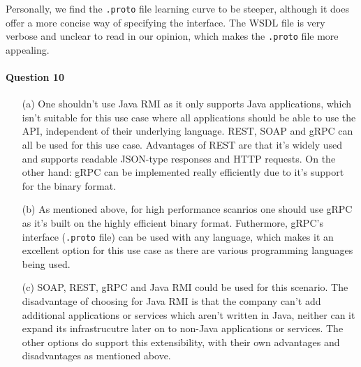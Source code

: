 \documentclass{ds-report}
\begin{document}
	Personally, we find the \texttt{.proto} file learning curve to be steeper, although it does offer a more concise way of specifying the interface. The WSDL file is very verbose and unclear to read in our opinion, which makes the \texttt{.proto} file more appealing.
	
	\paragraph{Question 10}
	\begin{enumerate}
		\item[(a)] One shouldn't use Java RMI as it only supports Java applications, which isn't suitable for this use case where all applications should be able to use the API, independent of their underlying language. REST, SOAP and gRPC can all be used for this use case. Advantages of REST are that it's widely used and supports readable JSON-type responses and HTTP requests. On the other hand: gRPC can be implemented really efficiently due to it's support for the binary format.
		\item[(b)] As mentioned above, for high performance scanrios one should use gRPC as it's built on the highly efficient binary format. Futhermore, gRPC's interface (\texttt{.proto} file) can be used with any language, which makes it an excellent option for this use case as there are various programming languages being used.
		\item[(c)] SOAP, REST, gRPC and Java RMI could be used for this scenario. The disadvantage of choosing for Java RMI is that the company can't add additional applications or services which aren't written in Java, neither can it expand its infrastrucutre later on to non-Java applications or services. The other options do support this extensibility, with their own advantages and disadvantages as mentioned above.
	\end{enumerate}
	\clearpage

	
\end{document}
